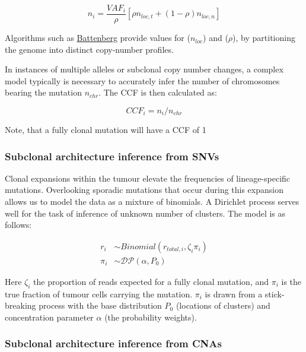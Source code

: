 {    \begin{equation}
        n_{i} = \frac{VAF_i}{\rho} [\rho n_{loc, t} + (1-\rho)n_{loc, n}]
    \end{equation}

    Algorithms such as \href{https://github.com/cancerit/cgpBattenberg}{Battenberg} provide values for ($n_{loc}$) and ($\rho$), by partitioning the genome into distinct copy-number profiles.

    In instances of multiple alleles or subclonal copy number changes, a complex model typically is necessary to accurately infer the number of chromosomes bearing the mutation $n_{chr}$. The \ac{CCF} is then calculated as:

    \begin{equation}
        CCF_i = n_i / n_{chr}
    \end{equation}

    Note, that a fully clonal mutation will have a \ac{CCF} of 1

    \subsubsection*{Subclonal architecture inference from \acp{SNV}}
    
    Clonal expansions within the tumour elevate the frequencies of lineage-specific mutations. Overlooking sporadic mutations that occur during this expansion allows us to model the data as a mixture of binomials. A Dirichlet process serves well for the task of inference of unknown number of clusters. The model is as follows:

    \begin{align}
        r_i &\sim Binomial(r_{total,i},\zeta_i\pi_i) \\
        \pi_i &\sim \mathcal{DP}(\alpha, P_0) 
    \end{align}

    Here $\zeta_i$  the proportion of reads expected for a fully clonal mutation, and $\pi_i$ is the true fraction of tumour cells carrying the mutation. $\pi_i$ is drawn from a stick-breaking process with the base distribution $P_0$ (locations of clusters) and concentration parameter $\alpha$ (the probability weights).

    \subsubsection*{Subclonal architecture inference from \acp{CNA}}

}
